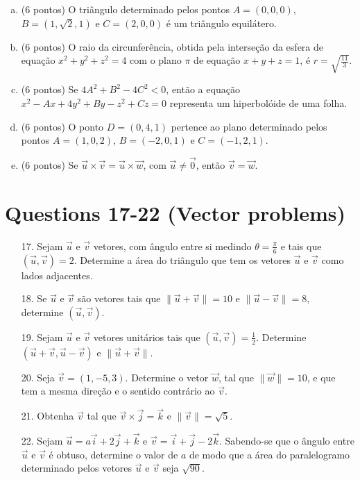 \documentclass{article}
\begin{document}
\begin{enumerate}[a)]
\item (6 pontos) O triângulo determinado pelos pontos $A = (0, 0, 0)$, $B = (1, \sqrt{2}, 1)$ e $C = (2, 0, 0)$ é um triângulo equilátero.
\item (6 pontos) O raio da circunferência, obtida pela interseção da esfera de equação $x^2 + y^2 + z^2 = 4$ com o plano $\pi$ de equação $x + y + z = 1$, é $r = \sqrt{\frac{11}{3}}$.
\item (6 pontos) Se $4A^2 + B^2 - 4C^2 < 0$, então a equação $x^2 - Ax + 4y^2 + By - z^2 + Cz = 0$ representa um hiperbolóide de uma folha.
\item (6 pontos) O ponto $D = (0, 4, 1)$ pertence ao plano determinado pelos pontos $A = (1, 0, 2)$, $B = (-2, 0, 1)$ e $C = (-1, 2, 1)$.
\item (6 pontos) Se $\vec{u} \times \vec{v} = \vec{u} \times \vec{w}$, com $\vec{u} \neq \vec{0}$, então $\vec{v} = \vec{w}$.
\end{enumerate}

\section*{Questions 17-22 (Vector problems)}
\begin{enumerate}
\item[17.] Sejam $\vec{u}$ e $\vec{v}$ vetores, com ângulo entre si medindo $\theta = \frac{\pi}{6}$ e tais que $(\vec{u}, \vec{v}) = 2$. Determine a área do triângulo que tem os vetores $\vec{u}$ e $\vec{v}$ como lados adjacentes.

\item[18.] Se $\vec{u}$ e $\vec{v}$ são vetores tais que $\|\vec{u} + \vec{v}\| = 10$ e $\|\vec{u} - \vec{v}\| = 8$, determine $(\vec{u}, \vec{v})$.

\item[19.] Sejam $\vec{u}$ e $\vec{v}$ vetores unitários tais que $(\vec{u}, \vec{v}) = \frac{1}{2}$. Determine $(\vec{u} + \vec{v}, \vec{u} - \vec{v})$ e $\|\vec{u} + \vec{v}\|$.

\item[20.] Seja $\vec{v} = (1, -5, 3)$. Determine o vetor $\vec{w}$, tal que $\|\vec{w}\| = 10$, e que tem a mesma direção e o sentido contrário ao $\vec{v}$.

\item[21.] Obtenha $\vec{v}$ tal que $\vec{v} \times \vec{j} = \vec{k}$ e $\|\vec{v}\| = \sqrt{5}$.

\item[22.] Sejam $\vec{u} = a\vec{i} + 2\vec{j} + \vec{k}$ e $\vec{v} = \vec{i} + \vec{j} - 2\vec{k}$. Sabendo-se que o ângulo entre $\vec{u}$ e $\vec{v}$ é obtuso, determine o valor de $a$ de modo que a área do paralelogramo determinado pelos vetores $\vec{u}$ e $\vec{v}$ seja $\sqrt{90}$.
\end{enumerate}
\end{document}
